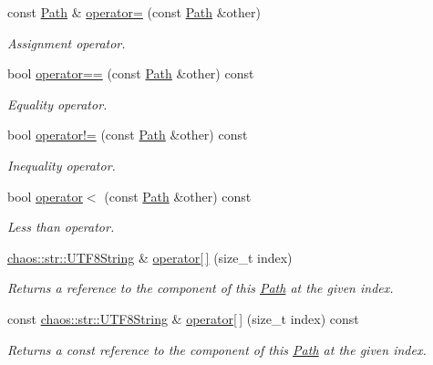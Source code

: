 \begin{DoxyCompactItemize}
const \hyperlink{classchaos_1_1io_1_1sys_1_1_path}{Path} \& \hyperlink{classchaos_1_1io_1_1sys_1_1_path_a45c70fc34ff619e890d5bc807dd70d8b}{operator=} (const \hyperlink{classchaos_1_1io_1_1sys_1_1_path}{Path} \&other)
\begin{DoxyCompactList}\small\item\em Assignment operator. \end{DoxyCompactList}\item 
bool \hyperlink{classchaos_1_1io_1_1sys_1_1_path_ac2e63307a0526625f4447f1d2a704e3b}{operator==} (const \hyperlink{classchaos_1_1io_1_1sys_1_1_path}{Path} \&other) const 
\begin{DoxyCompactList}\small\item\em Equality operator. \end{DoxyCompactList}\item 
bool \hyperlink{classchaos_1_1io_1_1sys_1_1_path_acd6dea0a797c0307179a5523239a299a}{operator!=} (const \hyperlink{classchaos_1_1io_1_1sys_1_1_path}{Path} \&other) const 
\begin{DoxyCompactList}\small\item\em Inequality operator. \end{DoxyCompactList}\item 
bool \hyperlink{classchaos_1_1io_1_1sys_1_1_path_a90858bbce348d5b36d0c31d771c601d8}{operator$<$} (const \hyperlink{classchaos_1_1io_1_1sys_1_1_path}{Path} \&other) const 
\begin{DoxyCompactList}\small\item\em Less than operator. \end{DoxyCompactList}\item 
\hyperlink{classchaos_1_1str_1_1_u_t_f8_string}{chaos\+::str\+::\+U\+T\+F8\+String} \& \hyperlink{classchaos_1_1io_1_1sys_1_1_path_a5727175125afbbf015465614097676a8}{operator\mbox{[}$\,$\mbox{]}} (size\+\_\+t index)
\begin{DoxyCompactList}\small\item\em Returns a reference to the component of this \hyperlink{classchaos_1_1io_1_1sys_1_1_path}{Path} at the given index. \end{DoxyCompactList}\item 
const \hyperlink{classchaos_1_1str_1_1_u_t_f8_string}{chaos\+::str\+::\+U\+T\+F8\+String} \& \hyperlink{classchaos_1_1io_1_1sys_1_1_path_a446e0dfcf53bf65e837400ab8f0231b5}{operator\mbox{[}$\,$\mbox{]}} (size\+\_\+t index) const 
\begin{DoxyCompactList}\small\item\em Returns a const reference to the component of this \hyperlink{classchaos_1_1io_1_1sys_1_1_path}{Path} at the given index. \end{DoxyCompactList}\item 

\end{DoxyCompactItemize}
